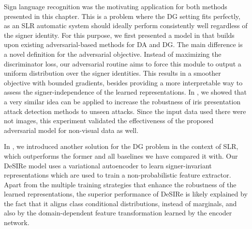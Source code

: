 Sign language recognition was the motivating application for both methods presented in this chapter. This is a problem where the DG setting fits perfectly, as an SLR automatic system should ideally perform consistently well regardless of the signer identity. For this purpose, we first presented a model in  that builds upon existing adversarial-based methods for DA and DG. The main difference is a novel definition for the adversarial objective. Instead of maximizing the discriminator loss, our adversarial routine aims to force this module to output a uniform distribution over the signer identities. This results in a smoother objective with bounded gradients, besides providing a more interpretable way to assess the signer-independence of the learned representations. In , we showed that a very similar idea can be applied to increase the robustness of iris presentation attack detection methods to unseen attacks. Since the input data used there were not images, this experiment validated the effectiveness of the proposed adversarial model for non-visual data as well.

In , we introduced another solution for the DG problem in the context of SLR, which outperforms the former and all baselines we have compared it with. Our DeSIRe model uses a variational autoencoder to learn signer-invariant representations which are used to train a non-probabilistic feature extractor. Apart from the multiple training strategies that enhance the robustness of the learned representations, the superior performance of DeSIRe is likely explained by the fact that it aligns class conditional distributions, instead of marginals, and also by the domain-dependent feature transformation learned by the encoder network.